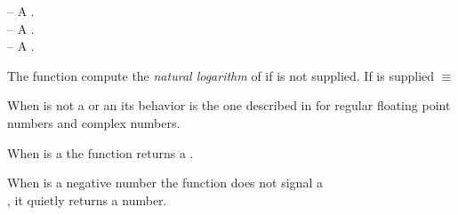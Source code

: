 \documentclass[../Comparisons-Predicates.tex]{subfiles}
\begin{document}

\DSyntax{}

   \RArrow{} 

\DArgsNValues{}

 -- A .\\
 -- A .\\
 -- A .

\DDescription{}

The function  compute the \emph{natural logarithm} of
 if  is not supplied. If  is
supplied   \code{)} $\equiv$   \code{))}

\noindent
When  is not a  or an
 its behavior is the one described in
\cite{1996:ANSIHyperSpec} for regular floating point numbers and complex
numbers.

\noindent
When  is a  the function 
returns a .

\noindent
When  is a negative 
number the function  does not signal a\\
, it quietly returns a
 number.
\end{document}

